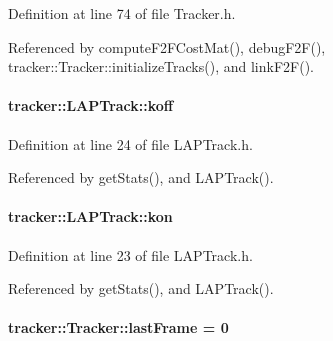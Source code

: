 Definition at line 74 of file Tracker.\+h.



Referenced by compute\+F2\+F\+Cost\+Mat(), debug\+F2\+F(), tracker\+::\+Tracker\+::initialize\+Tracks(), and link\+F2\+F().

\paragraph[{\texorpdfstring{koff}{koff}}]{ tracker\+::\+L\+A\+P\+Track\+::koff}\hypertarget{classtracker_1_1LAPTrack_a726079bfbbc885c065086b76ee549bfa}{}\label{classtracker_1_1LAPTrack_a726079bfbbc885c065086b76ee549bfa}


Definition at line 24 of file L\+A\+P\+Track.\+h.



Referenced by get\+Stats(), and L\+A\+P\+Track().

\paragraph[{\texorpdfstring{kon}{kon}}]{ tracker\+::\+L\+A\+P\+Track\+::kon}\hypertarget{classtracker_1_1LAPTrack_ad0e45f79d117cd5156818f27c3a41d45}{}\label{classtracker_1_1LAPTrack_ad0e45f79d117cd5156818f27c3a41d45}


Definition at line 23 of file L\+A\+P\+Track.\+h.



Referenced by get\+Stats(), and L\+A\+P\+Track().

\paragraph[{\texorpdfstring{last\+Frame}{lastFrame}}]{ tracker\+::\+Tracker\+::last\+Frame = 0\hspace{0.3cm}{\ttfamily [inherited]}}\hypertarget{classtracker_1_1Tracker_af3219a1e02551ca5c6aafc4a8c14ff30}{}\label{classtracker_1_1Tracker_af3219a1e02551ca5c6aafc4a8c14ff30}


